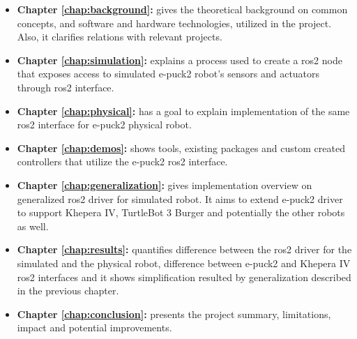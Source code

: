 \begin{itemize}
    \item \textbf{Chapter \ref{chap:background}: } gives the theoretical background on common concepts, and software and hardware technologies, utilized in the project. Also, it clarifies relations with relevant projects.
    
    \item \textbf{Chapter \ref{chap:simulation}: } explains a process used to create a \ac{ros2} node that exposes access to simulated e-puck2 robot's sensors and actuators through \ac{ros2} interface.
    
    \item \textbf{Chapter \ref{chap:physical}: } has a goal to explain implementation of the same \ac{ros2} interface for e-puck2 physical robot.
    
    \item \textbf{Chapter \ref{chap:demos}: } shows tools, existing packages and custom created controllers that utilize the e-puck2 \ac{ros2} interface.
    
    \item \textbf{Chapter \ref{chap:generalization}: } gives implementation overview on generalized \ac{ros2} driver for simulated robot. It aims to extend e-puck2 driver to support Khepera IV, TurtleBot 3 Burger and potentially the other robots as well.
    
    \item \textbf{Chapter \ref{chap:results}: } quantifies difference between the \ac{ros2} driver for the simulated and the physical robot, difference between e-puck2 and Khepera IV \ac{ros2} interfaces and it shows simplification resulted by generalization described in the previous chapter.
    
    \item \textbf{Chapter \ref{chap:conclusion}: } presents the project summary, limitations, impact and potential improvements.
\end{itemize}